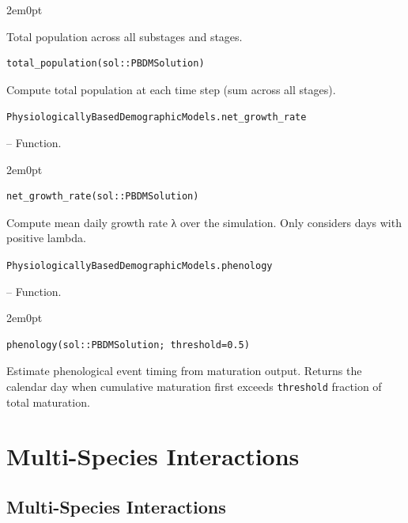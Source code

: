 \begin{adjustwidth}{2em}{0pt}

Total population across all substages and stages.




\begin{verbatim}
total_population(sol::PBDMSolution)
\end{verbatim}

Compute total population at each time step (sum across all stages).



\end{adjustwidth}
\hypertarget{17832701127005700039}{\texttt{PhysiologicallyBasedDemographicModels.net\_growth\_rate}}  -- {Function.}

\begin{adjustwidth}{2em}{0pt}


\begin{verbatim}
net_growth_rate(sol::PBDMSolution)
\end{verbatim}

Compute mean daily growth rate λ over the simulation. Only considers days with positive lambda.



\end{adjustwidth}
\hypertarget{11105121120346860972}{\texttt{PhysiologicallyBasedDemographicModels.phenology}}  -- {Function.}

\begin{adjustwidth}{2em}{0pt}


\begin{verbatim}
phenology(sol::PBDMSolution; threshold=0.5)
\end{verbatim}

Estimate phenological event timing from maturation output. Returns the calendar day when cumulative maturation first exceeds \texttt{threshold} fraction of total maturation.



\end{adjustwidth}

\chapter{Multi-Species Interactions}


\section{Multi-Species Interactions}




